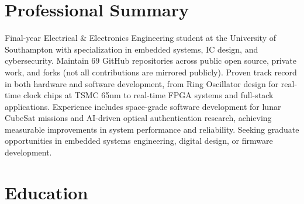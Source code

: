 \documentclass[11pt,a4paper,sans]{moderncv}
\begin{document}
\makecvtitle

\section{Professional Summary}
Final-year Electrical \& Electronics Engineering student at the University of Southampton with specialization in embedded systems, IC design, and cybersecurity. Maintain 69 GitHub repositories across public open source, private work, and forks (not all contributions are mirrored publicly). Proven track record in both hardware and software development, from Ring Oscillator design for real-time clock chips at TSMC 65nm to real-time FPGA systems and full-stack applications. Experience includes space-grade software development for lunar CubeSat missions and AI-driven optical authentication research, achieving measurable improvements in system performance and reliability. Seeking graduate opportunities in embedded systems engineering, digital design, or firmware development.

\section{Education}


\end{document}
